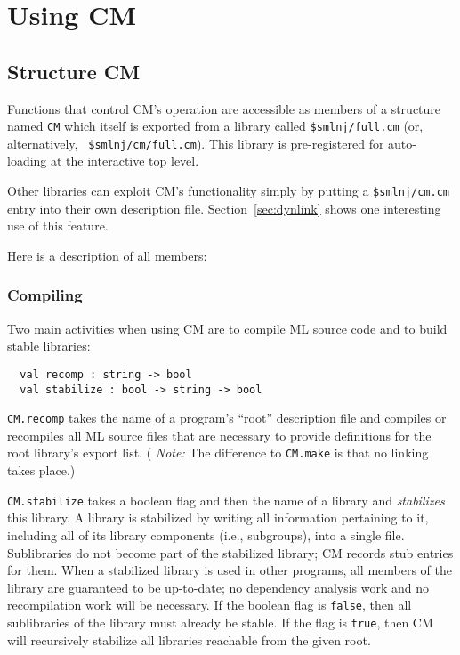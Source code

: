 \documentclass[titlepage,letterpaper]{article}
\begin{document}
\section{Using CM}

\subsection{Structure CM}
\label{sec:api}

Functions that control CM's operation are accessible as members of a
structure named {\tt CM} which itself is exported from a library
called {\tt \$smlnj/full.cm} (or, alternatively, {\tt
\$smlnj/cm/full.cm}).  This library is pre-registered for auto-loading
at the interactive top level.

Other libraries can exploit CM's functionality simply by putting a
{\tt \$smlnj/cm.cm} entry into their own description file.
Section~\ref{sec:dynlink} shows one interesting use of this feature.

Here is a description of all members:

\subsubsection*{Compiling}

Two main activities when using CM are to compile ML source code and to
build stable libraries:

\begin{verbatim}
  val recomp : string -> bool
  val stabilize : bool -> string -> bool
\end{verbatim}

{\tt CM.recomp} takes the name of a program's ``root'' description
file and compiles or recompiles all ML source files that are necessary
to provide definitions for the root library's export list.  ({\em
Note:} The difference to {\tt CM.make} is that no linking takes
place.)

{\tt CM.stabilize} takes a boolean flag and then the name of a library
and {\em stabilizes} this library.  A library is stabilized by writing
all information pertaining to it, including all of its library
components (i.e., subgroups), into a single file.  Sublibraries do not
become part of the stabilized library; CM records stub entries for them.
When a stabilized library is used in other programs, all members of
the library are guaranteed to be up-to-date; no dependency analysis
work and no recompilation work will be necessary.  If the boolean flag
is {\tt false}, then all sublibraries of the library must already be
stable.  If the flag is {\tt true}, then CM will recursively stabilize
all libraries reachable from the given root.
\end{document}
